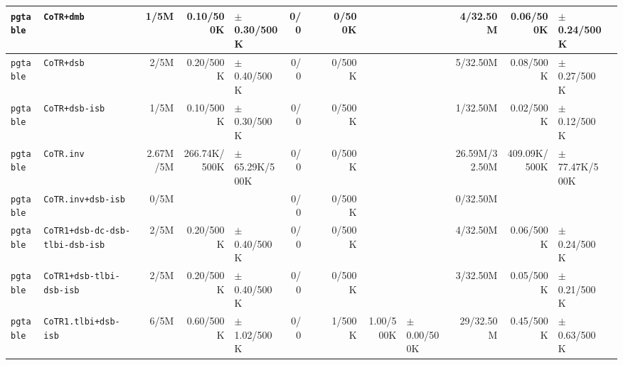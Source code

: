\begin{tabular}{l l  | r r l | r r l | r r l | r r l l}
        \verb|pgtable| &                                            \verb|CoTR+dmb| &           1/5M &             0.10/500K &   $\pm$ 0.30/500K &            0/0 &                       &  &         0/500K &                       &                   &       4/32.50M &             0.06/500K &   $\pm$ 0.24/500K & \\ \hline 
        \verb|pgtable| &                                            \verb|CoTR+dsb| &           2/5M &             0.20/500K &   $\pm$ 0.40/500K &            0/0 &                       &  &         0/500K &                       &                   &       5/32.50M &             0.08/500K &   $\pm$ 0.27/500K & \\ \hline 
        \verb|pgtable| &                                        \verb|CoTR+dsb-isb| &           1/5M &             0.10/500K &   $\pm$ 0.30/500K &            0/0 &                       &  &         0/500K &                       &                   &       1/32.50M &             0.02/500K &   $\pm$ 0.12/500K & \\ \hline 
        \verb|pgtable| &                                            \verb|CoTR.inv| &       2.67M/5M &          266.74K/500K & $\pm$ 65.29K/500K &            0/0 &                       &  &         0/500K &                       &                   &  26.59M/32.50M &          409.09K/500K & $\pm$ 77.47K/500K & \\ \hline 
        \verb|pgtable| &                                    \verb|CoTR.inv+dsb-isb| &           0/5M &                       &                   &            0/0 &                       &  &         0/500K &                       &                   &       0/32.50M &                       &                   & \\ \hline 
        \verb|pgtable| &                       \verb|CoTR1+dsb-dc-dsb-tlbi-dsb-isb| &           2/5M &             0.20/500K &   $\pm$ 0.40/500K &            0/0 &                       &  &         0/500K &                       &                   &       4/32.50M &             0.06/500K &   $\pm$ 0.24/500K & \\ \hline 
        \verb|pgtable| &                              \verb|CoTR1+dsb-tlbi-dsb-isb| &           2/5M &             0.20/500K &   $\pm$ 0.40/500K &            0/0 &                       &  &         0/500K &                       &                   &       3/32.50M &             0.05/500K &   $\pm$ 0.21/500K & \\ \hline 
        \verb|pgtable| &                                  \verb|CoTR1.tlbi+dsb-isb| &           6/5M &             0.60/500K &   $\pm$ 1.02/500K &            0/0 &                       &  &         1/500K &             1.00/500K &   $\pm$ 0.00/500K &      29/32.50M &             0.45/500K &   $\pm$ 0.63/500K & \\ \hline 

\end{tabular}
